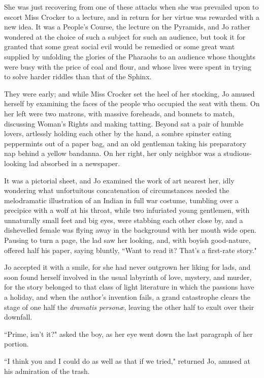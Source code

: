 She was just recovering from one of these attacks when she was prevailed
upon to escort Miss Crocker to a lecture, and in return for her virtue
was rewarded with a new idea. It was a People's Course,
the lecture on the Pyramids, and Jo rather wondered at the choice of
such a subject for such an audience, but took it for granted that some
great social evil would be remedied or some great want supplied by
unfolding the glories of the Pharaohs to an audience whose thoughts were
busy with the price of coal and flour, and whose lives were spent in
trying to solve harder riddles than that of the Sphinx.

They were early; and while Miss Crocker set the heel of her stocking, Jo
amused herself by examining the faces of the people who occupied the
seat with them. On her left were two matrons, with massive foreheads,
and bonnets to match, discussing Woman's Rights and
making tatting. Beyond sat a pair of humble lovers, artlessly holding
each other by the hand, a sombre spinster eating peppermints out of a
paper bag, and an old gentleman taking his preparatory nap behind a
yellow bandanna. On her right, her only neighbor was a studious-looking
lad absorbed in a newspaper.

It was a pictorial sheet, and Jo examined the work of art nearest her,
idly wondering what unfortuitous concatenation of circumstances needed
the melodramatic illustration of an Indian in full war costume, tumbling
over a precipice with a wolf at his throat, while two infuriated young
gentlemen, with unnaturally small feet and big eyes, were stabbing each
other close by, and a dishevelled female was flying away in the
background with her mouth wide open. Pausing to turn a page, the lad saw
her looking, and, with boyish good-nature, offered half his paper,
saying bluntly, ``Want to read it? That's a first-rate
story."

Jo accepted it with a smile, for she had never outgrown her liking for
lads, and soon found herself involved in the usual labyrinth of love,
mystery, and murder, for the story belonged to that class of light
literature in which the passions have a holiday, and when the
author's invention fails, a grand catastrophe clears the
stage of one half the \emph{dramatis personæ}, leaving the other half to
exult over their downfall.

``Prime, isn't it?" asked the boy, as her eye went down
the last paragraph of her portion.

``I think you and I could do as well as that if we tried," returned Jo,
amused at his admiration of the trash.

